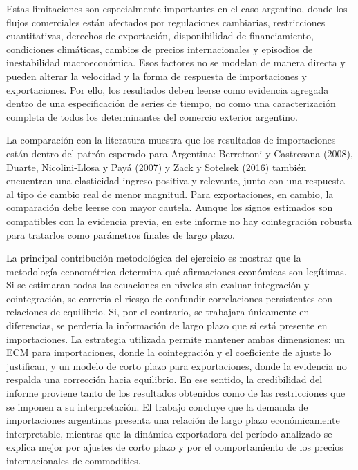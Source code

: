 \documentclass[11pt]{article}
\begin{document}
Estas limitaciones son especialmente importantes en el caso argentino, donde los
flujos comerciales están afectados por regulaciones cambiarias, restricciones
cuantitativas, derechos de exportación, disponibilidad de financiamiento,
condiciones climáticas, cambios de precios internacionales y episodios de
inestabilidad macroeconómica. Esos factores no se modelan de manera directa y
pueden alterar la velocidad y la forma de respuesta de importaciones y
exportaciones. Por ello, los resultados deben leerse como evidencia agregada
dentro de una especificación de series de tiempo, no como una caracterización
completa de todos los determinantes del comercio exterior argentino.

La comparación con la literatura muestra que los resultados de importaciones
están dentro del patrón esperado para Argentina: Berrettoni y Castresana (2008),
Duarte, Nicolini-Llosa y Payá (2007) y Zack y Sotelsek (2016) también
encuentran una elasticidad ingreso positiva y relevante, junto con una respuesta
al tipo de cambio real de menor magnitud. Para exportaciones, en cambio, la
comparación debe leerse con mayor cautela. Aunque los signos estimados son
compatibles con la evidencia previa, en este informe no hay cointegración
robusta para tratarlos como parámetros finales de largo plazo.

La principal contribución metodológica del ejercicio es mostrar que la
metodología econométrica determina qué afirmaciones económicas son legítimas. Si
se estimaran todas las ecuaciones en niveles sin evaluar integración y
cointegración, se correría el riesgo de confundir correlaciones persistentes con
relaciones de equilibrio. Si, por el contrario, se trabajara únicamente en
diferencias, se perdería la información de largo plazo que sí está presente en
importaciones. La estrategia utilizada permite mantener ambas dimensiones: un
ECM para importaciones, donde la cointegración y el coeficiente de ajuste lo
justifican, y un modelo de corto plazo para exportaciones, donde la evidencia no
respalda una corrección hacia equilibrio. En ese sentido, la credibilidad del
informe proviene tanto de los resultados obtenidos como de las restricciones que
se imponen a su interpretación. El trabajo concluye que la demanda de
importaciones argentinas presenta una relación de largo plazo económicamente
interpretable, mientras que la dinámica exportadora del período analizado se
explica mejor por ajustes de corto plazo y por el comportamiento de los precios
internacionales de commodities.
\end{document}

